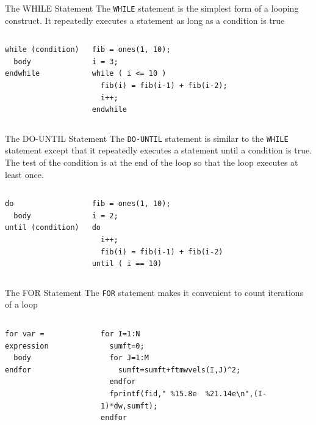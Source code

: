 \documentclass[t,compress,xcolor=svgnames]{beamer}
\newenvironment{eblock}[0]
{
\begin{beamerboxesrounded}[upper=uppercol2,lower=lowercol2,shadow=true]}
{\end{beamerboxesrounded}}
\begin{document}
\begin{frame}
  \begin{eblock}{The WHILE Statement}
    The \texttt{WHILE} statement is the simplest form of a looping construct. It repeatedly executes a statement as long as a condition is true
    {\tiny
      \begin{columns}
        \column{4cm}
        \begin{verbatim}
while (condition)
  body
endwhile
        \end{verbatim}
        \column{6cm}
        \begin{verbatim}
fib = ones(1, 10);
i = 3;
while ( i <= 10 )
  fib(i) = fib(i-1) + fib(i-2); 
  i++;
endwhile
        \end{verbatim}
      \end{columns}
    }
  \end{eblock}

  \begin{eblock}{The DO-UNTIL Statement}
    The \texttt{DO-UNTIL} statement is similar to the \texttt{WHILE} statement except that it repeatedly executes a statement until a condition is true. The test of the condition is at the end of the loop so that the loop executes at least once.
    {\tiny
      \begin{columns}
        \column{4cm}
        \begin{verbatim}
do
  body
until (condition)
        \end{verbatim}
        \column{6cm}
        \begin{verbatim}
fib = ones(1, 10);
i = 2;
do
  i++;
  fib(i) = fib(i-1) + fib(i-2) 
until ( i == 10)
        \end{verbatim}
      \end{columns}
    }
  \end{eblock}

  \begin{eblock}{The FOR Statement}
    The \texttt{FOR} statement makes it convenient to count iterations of a loop
    {\tiny
      \begin{columns}
        \column{3cm}
        \begin{verbatim}
for var = expression
  body
endfor
        \end{verbatim}
        \column{7cm}
        \begin{verbatim}
for I=1:N
  sumft=0;
  for J=1:M
    sumft=sumft+ftmwvels(I,J)^2;
  endfor
  fprintf(fid," %15.8e  %21.14e\n",(I-1)*dw,sumft);
endfor
        \end{verbatim}
      \end{columns}
    }
  \end{eblock}


\end{frame}
\end{document}

